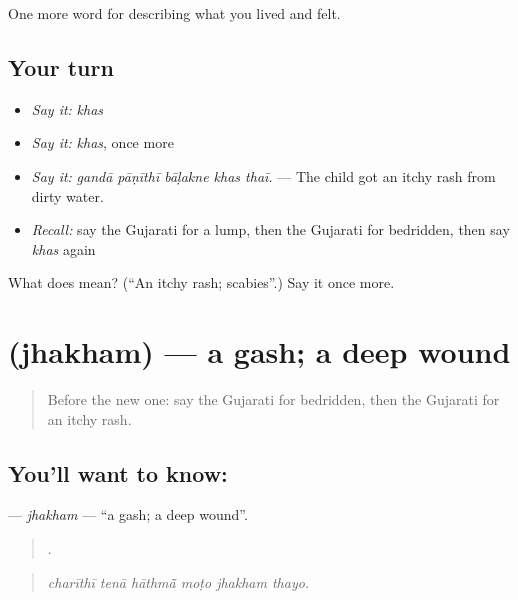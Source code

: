 \begin{grammarlens}[title={What you've built}]
One more word for describing what you lived and felt.
\end{grammarlens}

\subsection*{Your turn}
\begin{itemize}
\raggedright
  \item \emph{Say it:} \emph{khas}
  \item \emph{Say it:} \emph{khas}, once more
  \item \emph{Say it:} \emph{gandā pāṇīthī bāḷakne khas thaī.} — The child got an itchy rash from dirty water.
  \item \emph{Recall:} say the Gujarati for a lump, then the Gujarati for bedridden, then say \emph{khas} again
\end{itemize}

\begin{tcolorbox}[breakable,colback=teal!4,colframe=teal!35!black,title={Before you move on}]
What does  mean? (\textquotedblleft{}An itchy rash; scabies\textquotedblright{}.) Say it once more.
\end{tcolorbox}
\section[\texorpdfstring{\gu{ઝખમ} (jhakham)}{ઝખમ (jhakham)}]{ (jhakham) — a gash; a deep wound}

\label{lesson:GU-C480-jhakham}



\begin{quote}
Before the new one: say the Gujarati for bedridden, then the Gujarati for an itchy rash.
\end{quote}

\subsection*{You'll want to know: }
\textbf{} — \emph{jhakham} — \textquotedblleft{}a gash; a deep wound\textquotedblright{}.

\begin{quote}
     .
\end{quote}

\begin{quote}
\emph{charīthī tenā hāthmā̃ moṭo jhakham thayo.}
\end{quote}

